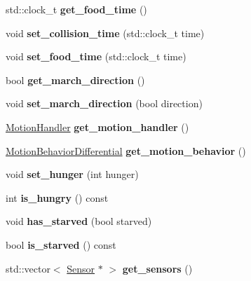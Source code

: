 \begin{DoxyCompactItemize}
\item 
std\+::clock\+\_\+t {\bfseries get\+\_\+food\+\_\+time} ()\hypertarget{classRobot_a4ef4af70f72510a265303a06fc8da84d}{}\label{classRobot_a4ef4af70f72510a265303a06fc8da84d}

\item 
void {\bfseries set\+\_\+collision\+\_\+time} (std\+::clock\+\_\+t time)\hypertarget{classRobot_aea715b97da0f53353e4087e7abb58cf9}{}\label{classRobot_aea715b97da0f53353e4087e7abb58cf9}

\item 
void {\bfseries set\+\_\+food\+\_\+time} (std\+::clock\+\_\+t time)\hypertarget{classRobot_ac9f8af737f27dfae37b9fc2aea5c98d7}{}\label{classRobot_ac9f8af737f27dfae37b9fc2aea5c98d7}

\item 
bool {\bfseries get\+\_\+march\+\_\+direction} ()\hypertarget{classRobot_a2352bf0e12761edbf1982255f1b360e2}{}\label{classRobot_a2352bf0e12761edbf1982255f1b360e2}

\item 
void {\bfseries set\+\_\+march\+\_\+direction} (bool direction)\hypertarget{classRobot_a773df88aa5e58e2e28aac366698683b4}{}\label{classRobot_a773df88aa5e58e2e28aac366698683b4}

\item 
\hyperlink{classMotionHandler}{Motion\+Handler} {\bfseries get\+\_\+motion\+\_\+handler} ()\hypertarget{classRobot_ae353888f546fed9759f0377951d07acb}{}\label{classRobot_ae353888f546fed9759f0377951d07acb}

\item 
\hyperlink{classMotionBehaviorDifferential}{Motion\+Behavior\+Differential} {\bfseries get\+\_\+motion\+\_\+behavior} ()\hypertarget{classRobot_ab45bf3c6fdafcd14cdbdb2a8e3f558b8}{}\label{classRobot_ab45bf3c6fdafcd14cdbdb2a8e3f558b8}

\item 
void {\bfseries set\+\_\+hunger} (int hunger)\hypertarget{classRobot_a6e8b86054c0692d8b3054b5bef1b9844}{}\label{classRobot_a6e8b86054c0692d8b3054b5bef1b9844}

\item 
int {\bfseries is\+\_\+hungry} () const \hypertarget{classRobot_a037c2793c3af1bfc0860ae12b7f6d0b0}{}\label{classRobot_a037c2793c3af1bfc0860ae12b7f6d0b0}

\item 
void {\bfseries has\+\_\+starved} (bool starved)\hypertarget{classRobot_af4dd38eb14206e1df3f93fba20463f85}{}\label{classRobot_af4dd38eb14206e1df3f93fba20463f85}

\item 
bool {\bfseries is\+\_\+starved} () const \hypertarget{classRobot_aa0203205869b78b235f4f66d9c263186}{}\label{classRobot_aa0203205869b78b235f4f66d9c263186}

\item 
std\+::vector$<$ \hyperlink{classSensor}{Sensor} $\ast$ $>$ {\bfseries get\+\_\+sensors} ()\hypertarget{classRobot_aa6945f79aadfb37257ea0f7075b13129}{}\label{classRobot_aa6945f79aadfb37257ea0f7075b13129}

\end{DoxyCompactItemize}
